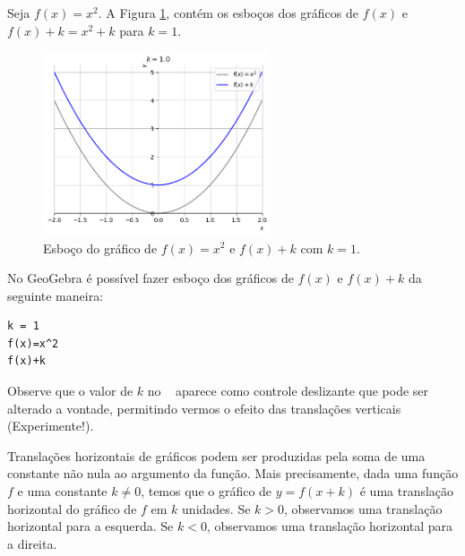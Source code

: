\documentclass[../main.tex]{subfiles}
\begin{document}
\begin{ex}
  Seja $f(x) = x^2$. A Figura \ref{fig:ex_trans_vert}, contém os esboços dos gráficos de $f(x)$ e $f(x)+k = x^2+k$ para $k=1$.

  \begin{figure}[H]
    \centering
    \includegraphics[width=0.6\textwidth]{fig_func/fig_ex_transvert}
    \caption{Esboço do gráfico de $f(x) = x^2$ e $f(x)+k$ com $k=1$.}
    \label{fig:ex_trans_vert}
  \end{figure}

  
 No GeoGebra é possível fazer esboço dos gráficos de $f(x)$ e $f(x)+k$ da seguinte maneira:
\begin{verbatim}
k = 1
f(x)=x^2
f(x)+k
\end{verbatim}
  Observe que o valor de $k$ no \geogebra~ aparece como controle deslizante que pode ser alterado a vontade, permitindo vermos o efeito das translações verticais (\dica Experimente!).
\end{ex}

\vspace{0.3cm}
Translações horizontais de gráficos podem ser produzidas pela soma de uma constante não nula ao argumento da função. Mais precisamente, dada uma função $f$ e uma constante $k\neq 0$, temos que o gráfico de $y=f(x+k)$ é uma translação horizontal do gráfico de $f$ em $k$ unidades. Se $k>0$, observamos uma translação horizontal para a esquerda. Se $k<0$, observamos uma translação horizontal para a direita.\\
\end{document}
